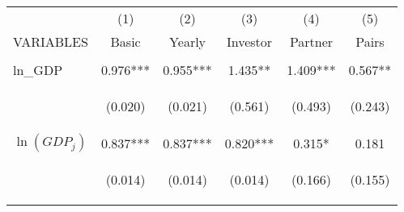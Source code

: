 \begin{center}
\begin{tabular}{lccccc} \hline
 & (1) & (2) & (3) & (4) & (5) \\
VARIABLES & Basic & Yearly & Investor & Partner & Pairs \\ \hline
\vspace{4pt} & \begin{footnotesize}\end{footnotesize} & \begin{footnotesize}\end{footnotesize} & \begin{footnotesize}\end{footnotesize} & \begin{footnotesize}\end{footnotesize} & \begin{footnotesize}\end{footnotesize} \\
ln\_GDP & 0.976*** & 0.955*** & 1.435** & 1.409*** & 0.567** \\
\vspace{4pt} & \begin{footnotesize}(0.020)\end{footnotesize} & \begin{footnotesize}(0.021)\end{footnotesize} & \begin{footnotesize}(0.561)\end{footnotesize} & \begin{footnotesize}(0.493)\end{footnotesize} & \begin{footnotesize}(0.243)\end{footnotesize} \\
$\ln(GDP_j)$ & 0.837*** & 0.837*** & 0.820*** & 0.315* & 0.181 \\
\vspace{4pt} & \begin{footnotesize}(0.014)\end{footnotesize} & \begin{footnotesize}(0.014)\end{footnotesize} & \begin{footnotesize}(0.014)\end{footnotesize} & \begin{footnotesize}(0.166)\end{footnotesize} & \begin{footnotesize}(0.155)\end{footnotesize} \\

\end{tabular}
\end{center}
